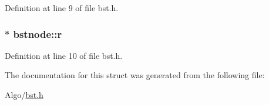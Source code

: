 Definition at line 9 of file bst.\-h.

\hypertarget{structbstnode_ae28d7cda479c7ba7ad8a00e324e65447}{
\subsubsection[{r}]{$\ast$ bstnode\-::r}}\label{structbstnode_ae28d7cda479c7ba7ad8a00e324e65447}


Definition at line 10 of file bst.\-h.



The documentation for this struct was generated from the following file\-:\begin{DoxyCompactItemize}
\item 
Algo/\hyperlink{bst_8h}{bst.\-h}\end{DoxyCompactItemize}
